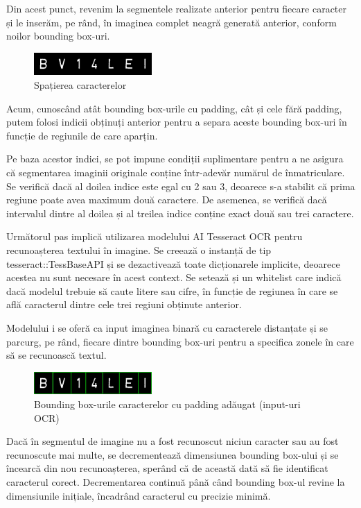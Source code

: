 \documentclass[a4paper,12pt]{report}
\begin{document}
Din acest punct, revenim la segmentele realizate anterior pentru fiecare caracter și le inserăm, pe rând, în imaginea complet neagră generată anterior, conform noilor bounding box-uri.

\begin{figure}[h]
    \centering
    \includegraphics[width=0.4\textwidth]{images/spaced.jpg}
    \caption{Spațierea caracterelor}
\end{figure}
\FloatBarrier

Acum, cunoscând atât bounding box-urile cu padding, cât și cele fără padding, putem folosi indicii obținuți anterior pentru a separa aceste bounding box-uri în funcție de regiunile de care aparțin.

Pe baza acestor indici, se pot impune condiții suplimentare pentru a ne asigura că segmentarea imaginii originale conține într-adevăr numărul de înmatriculare. Se verifică dacă al doilea indice este egal cu 2 sau 3, deoarece s-a stabilit că prima regiune poate avea maximum două caractere. De asemenea, se verifică dacă intervalul dintre al doilea și al treilea indice conține exact două sau trei caractere.

Următorul pas implică utilizarea modelului AI Tesseract OCR pentru recunoașterea textului în imagine. Se creează o instanță de tip tesseract::TessBaseAPI și se dezactivează toate dicționarele implicite, deoarece acestea nu sunt necesare în acest context. Se setează și un whitelist care indică dacă modelul trebuie să caute litere sau cifre, în funcție de regiunea în care se află caracterul dintre cele trei regiuni obținute anterior.

Modelului i se oferă ca input imaginea binară cu caracterele distanțate și se parcurg, pe rând, fiecare dintre bounding box-uri pentru a specifica zonele în care să se recunoască textul.

\begin{figure}[h]
    \centering
    \includegraphics[width=0.4\textwidth]{images/input_ocr.jpg}
    \caption{Bounding box-urile caracterelor cu padding adăugat (input-uri OCR) }
\end{figure}
\FloatBarrier

Dacă în segmentul de imagine nu a fost recunoscut niciun caracter sau au fost recunoscute mai multe, se decrementează dimensiunea bounding box-ului și se încearcă din nou recunoașterea, sperând că de această dată să fie identificat caracterul corect. Decrementarea continuă până când bounding box-ul revine la dimensiunile inițiale, încadrând caracterul cu precizie minimă.
\end{document}
